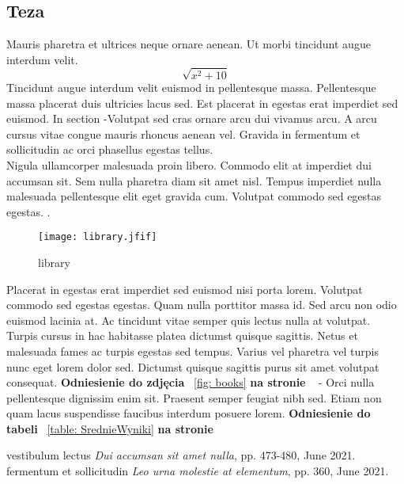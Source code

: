 \documentclass[12pt,a4paper]{article}
\begin{document}
	
	\subsection{Teza}
	Mauris pharetra et ultrices neque ornare aenean. Ut morbi tincidunt augue interdum velit.
	\[\sqrt{x^2+10}\] 
	Tincidunt augue interdum velit euismod in pellentesque massa. Pellentesque massa placerat duis ultricies lacus sed. Est placerat in egestas erat imperdiet sed euismod. 
	In section  -Volutpat sed cras ornare arcu dui vivamus arcu. A arcu cursus vitae congue mauris rhoncus aenean vel. Gravida in fermentum et sollicitudin ac orci phasellus egestas tellus.
	\\Nigula ullamcorper malesuada proin libero. Commodo elit at imperdiet dui accumsan sit. Sem nulla pharetra diam sit amet nisl. Tempus imperdiet nulla malesuada pellentesque elit eget gravida cum. Volutpat commodo sed egestas egestas. . 
	\begin{figure}[H]
		\centering
		\texttt{[image: library.jfif]}
		\caption{library}
		\label{fig: library}
	\end{figure}

	Placerat in egestas erat imperdiet sed euismod nisi porta lorem. Volutpat commodo sed egestas egestas. Quam nulla porttitor massa id. Sed arcu non odio euismod lacinia at. Ac tincidunt vitae semper quis lectus nulla at volutpat. Turpis cursus in hac habitasse platea dictumst quisque sagittis. Netus et malesuada fames ac turpis egestas sed tempus. Varius vel pharetra vel turpis nunc eget lorem dolor sed. Dictumst quisque sagittis purus sit amet volutpat consequat.  \textbf{Odniesienie do zdjęcia} ~\ref{fig: books} \textbf{na stronie} ~\pageref{fig: books} - Orci nulla pellentesque dignissim
	enim sit. Praesent semper feugiat nibh sed. Etiam non quam lacus suspendisse faucibus interdum posuere lorem. \textbf{Odniesienie do tabeli} ~\ref{table: SrednieWyniki} \textbf{na stronie} ~\pageref{table: SrednieWyniki}
	
	\newpage
	\begin{thebibliography}{10}
		vestibulum lectus \emph{Dui accumsan sit amet nulla}, pp. 473-480, June 2021.
		fermentum et sollicitudin \emph{Leo urna molestie at elementum}, pp. 360, June 2021.
	\end{thebibliography}
	
\end{document}

